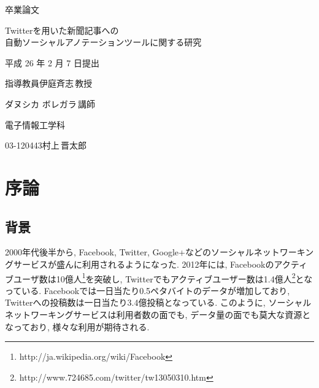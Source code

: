\documentclass[12pt]{jarticle}
\begin{document}
\pagestyle{empty}
\begin{center}
  \vspace*{3.0cm}
  {\fontsize{80pt}{100pt}\selectfont 卒業論文}

  \vspace*{2.0cm}

  \begin{LARGE}
    Twitterを用いた新聞記事への\\
    自動ソーシャルアノテーションツールに関する研究
    \vspace*{2.0cm}

    平成 26 年 2 月 7 日提出
  \end{LARGE}

\end{center}
\begin{LARGE}
  \vspace*{1.0cm}
  \hspace{25mm}指導教員\hspace{51mm}伊庭斉志\,教授

  \hspace{70mm}ダヌシカ ボレガラ\,講師

  \vspace*{1.0cm}
  \begin{center}
    電子情報工学科

    \vspace{1.0cm}
    03-120443\hspace{15mm}村上\,晋太郎
  \end{center}

\end{LARGE}

\newpage
\tableofcontents

\newpage
\setcounter{page}{1}
\pagestyle{plain}

\section{序論}
\subsection{背景}
2000年代後半から, Facebook, Twitter, Google+などのソーシャルネットワーキングサービスが盛んに利用されるようになった. 2012年には, Facebookのアクティブユーザ数は10億人\footnote{http://ja.wikipedia.org/wiki/Facebook}を突破し, Twitterでもアクティブユーザー数は1.4億人\footnote{http://www.724685.com/twitter/tw13050310.htm}となっている. Facebookでは一日当たり0.5ペタバイトのデータが増加しており, Twitterへの投稿数は一日当たり3.4億投稿となっている.
このように, ソーシャルネットワーキングサービスは利用者数の面でも, データ量の面でも莫大な資源となっており, 様々な利用が期待される.
\end{document}
